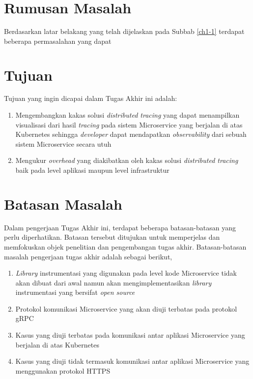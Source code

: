 \section{Rumusan Masalah}\label{RumusanMasalah}

Berdasarkan latar belakang yang telah dijelaskan pada Subbab \ref{ch1-1} terdapat beberapa permasalahan yang dapat 

\section{Tujuan}

Tujuan yang ingin dicapai dalam Tugas Akhir ini adalah:
\begin{enumerate}
	\item Mengembangkan kakas solusi \textit{distributed tracing}  yang dapat menampilkan visualisasi dari hasil \textit{tracing} pada sistem Microservice yang berjalan di atas Kubernetes sehingga \textit{developer} dapat mendapatkan \textit{observability} dari sebuah sistem Microservice secara utuh
	\item Mengukur \textit{overhead} yang diakibatkan oleh kakas solusi \textit{distributed tracing} baik pada level aplikasi maupun level infrastruktur
\end{enumerate}


\section{Batasan Masalah}

Dalam pengerjaan Tugas Akhir ini, terdapat beberapa batasan-batasan yang perlu diperhatikan. Batasan tersebut ditujukan untuk memperjelas dan memfokuskan objek penelitian dan pengembangan tugas akhir. Batasan-batasan masalah pengerjaan tugas akhir adalah sebagai berikut,

\begin{enumerate}
	\item \textit{Library} instrumentasi yang digunakan pada level kode Microservice tidak akan dibuat dari awal namun akan mengimplementasikan \textit{library} instrumentasi yang bersifat \textit{open source}
	\item Protokol komunikasi Microservice yang akan diuji terbatas pada protokol gRPC
	\item Kasus yang diuji terbatas pada komunikasi antar aplikasi Microservice yang berjalan di atas Kubernetes
	\item Kasus yang diuji tidak termasuk komunikasi antar aplikasi Microservice yang menggunakan protokol HTTPS
\end{enumerate}

